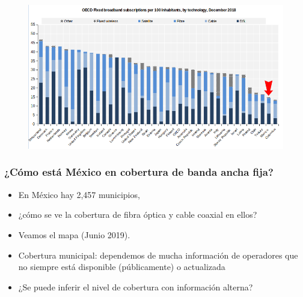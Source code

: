\documentclass[xcolor=dvipsnames, compress]{beamer}
\begin{document}
\begin{frame}

\begin{figure}
	\includegraphics[scale=0.4]{images/ocde.png}
\end{figure}
\end{frame}


 \begin{frame}
\frametitle{¿Cómo está México en cobertura de banda ancha fija?}
\begin{itemize}
	\item En México hay 2,457 municipios,
	\item ¿cómo se ve la cobertura de fibra óptica y cable coaxial en ellos? 
	\item Veamos el mapa (Junio 2019).
	\item Cobertura municipal: dependemos de mucha información de operadores que no siempre está disponible (públicamente)  o actualizada
	\item ¿Se puede inferir el nivel de cobertura con información alterna?	
\end{itemize}
\end{frame}
\end{document}
